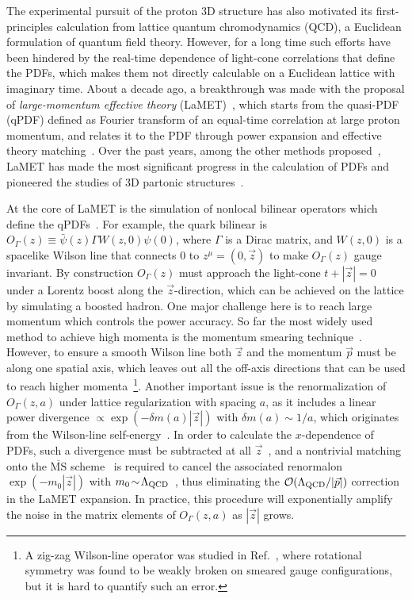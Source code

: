 \documentclass[prd,twocolumn,preprintnumbers,showpacs,nofootinbib,superscriptaddress,notitlepage,floatfix]{revtex4-1}
\newcommand{\MS}{{\overline{\mathrm{MS}}}}
\begin{document}
The experimental pursuit of the proton 3D structure has also motivated its first-principles calculation from lattice quantum chromodynamics (QCD), a Euclidean formulation of quantum field theory. However, for a long time such efforts have been hindered by the real-time dependence of light-cone correlations that define the PDFs, which makes them not directly calculable on a Euclidean lattice with imaginary time.
About a decade ago, a breakthrough was made with the proposal of \textit{large-momentum effective theory} (LaMET)~\cite{Ji:2013dva,Ji:2014gla,Ji:2020ect}, which starts from the quasi-PDF (qPDF) defined as Fourier transform of an equal-time correlation at large proton momentum, and relates it to the PDF through power expansion and effective theory matching~\cite{Ji:2020byp}. Over the past years, among the other methods proposed~\cite{Liu:1993cv,Detmold:2005gg,Braun:2007wv,Chambers:2017dov,Radyushkin:2017cyf,Ma:2017pxb}, LaMET has made the most significant progress in the calculation of PDFs and pioneered the studies of 3D partonic structures~\cite{Ji:2020ect,Constantinou:2020hdm,Boussarie:2023izj}.

At the core of LaMET is the simulation of nonlocal bilinear operators which define the qPDFs~\cite{Ji:2013dva}. For example, the quark bilinear is $O_\Gamma(z)\equiv \bar{\psi}(z)\Gamma W(z,0) \psi(0)$, where $\Gamma$ is a Dirac matrix, and $W(z,0)$ is a spacelike Wilson line that connects $0$ to $z^\mu=(0,\vec{z})$ to make $O_\Gamma(z)$ gauge invariant. 
By construction $O_\Gamma(z)$ must approach the light-cone $t+|\vec{z}|=0$ under a Lorentz boost along the $\vec{z}$-direction, which can be achieved on the lattice by simulating a boosted hadron. One major challenge here is to reach large momentum which controls the power accuracy. 
So far the most widely used method to achieve high momenta is the momentum smearing technique~\cite{Bali:2016lva}.
However, to ensure a smooth Wilson line both $\vec{z}$ and the momentum $\vec{p}$ must be along one spatial axis, which leaves out all the off-axis directions that can be used to reach higher momenta~\footnote{A zig-zag Wilson-line operator was studied in Ref.~\cite{Musch:2010ka}, where rotational symmetry was found to be weakly broken on smeared gauge configurations, but it is hard to quantify such an error.}.
Another important issue is the renormalization of $O_\Gamma(z,a)$ under lattice regularization with spacing $a$, as it includes a linear power divergence $\propto \exp(-\delta m(a)|\vec{z}|)$ with $\delta m(a) \!\sim \!1/a$, which originates from the Wilson-line self-energy~\cite{Dorn:1986dt,Maiani:1991az}. In order to calculate the $x$-dependence of PDFs, such a divergence must be subtracted at all $\vec{z}$~\cite{Ji:2020brr}, and a nontrivial matching onto the $\MS$ scheme~\cite{Holligan:2023rex,Zhang:2023bxs} is required to cancel the associated renormalon $\exp(-m_0|\vec{z}|)$ with $m_0\!\sim\! \Lambda_{\rm QCD}$~\cite{Bali:2013pla}, thus eliminating the ${\cal O}(\Lambda_{\rm QCD}/|\vec{p}|)$ correction in the LaMET expansion. 
In practice, this procedure will exponentially amplify the noise in the matrix elements of $O_\Gamma(z,a)$ as $|\vec{z}|$ grows.
\end{document}
